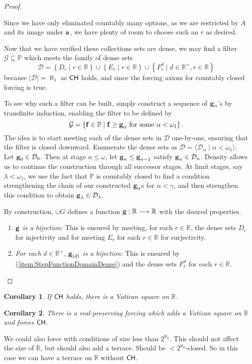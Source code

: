 \documentclass[11pt]{amsart}
\newtheorem{corollary}{Corollary}
\theoremstyle{definition}
\theoremstyle{remark}
\renewcommand{\P}{\mathbb{P}}
\newcommand{\R}{\mathbb{R}}
\newcommand{\CH}{\textup{\textsf{CH}}}
\newcommand{\st}{\; | \;}
\newcommand{\set}[2]{\left\{#1\st #2 \right\}}
\newcommand{\seq}[2]{\langle #1 \st #2 \rangle}
\newcommand{\To}{\longrightarrow}
\renewcommand{\a}{\textup{\textbf{a}}}
\newcommand{\g}{\textup{\textbf{g}}}
\newcommand{\f}{\textup{\textbf{f}}}
\renewcommand{\r}{\overline r}
\begin{document}
\begin{proof}
\begin{enumerate}
Since we have only eliminated countably many options, as we are restricted by $A$ and its image under $\a$, we have plenty of room to choose such an $\r$ as desired.\\
\end{enumerate}

Now that we have verified these collections sets are dense, we may find a filter $\mathcal G\subseteq \P$ which meets the family of dense sets $$\mathcal D = \set{D_r}{r\in \R} \cup \set{E_r}{r \in \R} \cup \set{F^d_r}{d \in \R^+, r \in \R}$$ because $|\mathcal D|=\aleph_1$ as $\CH$ holds, and since the forcing axiom for countably closed forcing is true. 

To see why such a filter can be built, simply construct a sequence of $\g_\alpha$'s by transfinite induction, enabling the filter to be defined by 
	$$\mathcal G=\set{\f \in \P}{\f \geq \g_\alpha \text{ for some } \alpha<\omega_1}.$$ 
The idea is to start meeting each of the dense sets in $\mathcal D$ one-by-one, ensuring that the filter is closed downward. Enumerate the dense sets as $\mathcal D = \seq{\mathcal D_\alpha}{\alpha<\omega_1}$. Let $\g_0 \in \mathcal D_0$. Then at stage $n \leq \omega$, let $\g_n \leq \g_{n-1}$ satisfy $\g_n \in \mathcal D_n$. Density allows us to continue the construction through all successor stages. At limit stages, say $\lambda <\omega_1$, we use the fact that $\P$ is countably closed to find a condition strengthening the chain of our constructed $\g_\alpha$s for $\alpha<\gamma$, and then strengthen this condition to obtain $\g_\lambda \in \mathcal D_\lambda$.

By construction, $\cup G$ defines a function $\g: \R \To \R$ with the desired properties. 

\begin{enumerate}
	\item \emph{$\g$ is a bijection:} This is ensured by meeting, for each $r \in \R$, the dense sets $D_r$ for injectivity and for meeting $E_r$ for each $r \in \R$ for surjectivity.\\
	\item \emph{For each $d \in \R^+$, $\g_{(d)}$ is a bijection:} This is ensured by (\ref{item:StepFunctionDomainDense}) and the dense sets $F^d_r$ for each $r \in \R$. \qedhere
\end{enumerate}
\end{proof}
		
\begin{corollary} If $\CH$ holds, there is a Vatican square on $\R$. \end{corollary}
\begin{corollary} There is a real-preserving forcing which adds a Vatican square on $\R$ and forces $\CH$. \end{corollary}
We could also force with conditions of size less than $2^{\aleph_0}$. This should not affect the size of $\R$, but should also add a terrace. Should be $<2^{\aleph_0}$-closed. So in this case we can have a terrace on $\R$ without $\CH$.
\end{document}
